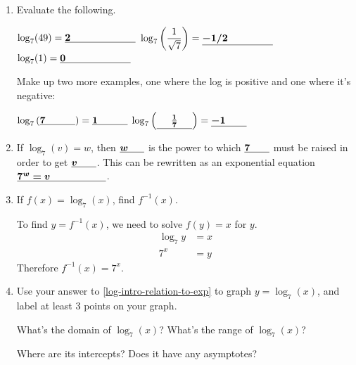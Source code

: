 \documentclass{article}
\begin{document}
\begin{enumerate}
\begin{enumerate}
  \item Evaluate the following.

    $\log_7 (49) = \fitb{1in}{2}$ \qquad $\displaystyle \log_7 \left( \frac{1}{\sqrt{7}} \right) = \fitb{1in}{-1/2}$ \qquad $\log_7 (1) = \fitb{1in}{0}$

    \pspace{0.5in}

    Make up two more examples, one where the log is positive and one where it's negative:

    $\log_7 \left( \fitb{0.5in}{7} \right)= \fitb{0.5in}{1}$ \qquad $\displaystyle \log_7 \left( \cfitb{0.5in}{\frac{1}{7}} \right) = \fitb{0.5in}{-1}$

    \pspace{0.5in}

    \pspace{\newpage}

  \item If $\log_7 (v) = w$, then $\fitb{0.35in}{w}$ is the power to which $\fitb{0.35in}{7}$ must be raised in order to get $\fitb{0.35in}{v}$. This can be rewritten as an exponential equation 
  $\fitb{1.25in}{7^w=v}$.

  \item \label{log-intro-relation-to-exp}
    \begin{problem}[\stretch{0.5}]
      If $f(x) = \log_7 (x)$, find $f^{-1}(x)$. 
    \end{problem}

    \begin{solution}
      To find $y=f^{-1}(x)$, we need to solve $f(y)=x$ for $y$.
      \begin{align*}
        \log_7 y &= x \\
        7^x &= y
      \end{align*}
      Therefore $f^{-1}(x) = 7^x$.
    \end{solution}

  \item
    \begin{problem}[\vfill]
      Use your answer to \ref{log-intro-relation-to-exp} to graph $y = \log_7 (x)$, and label at least 3 points on your graph.
    \end{problem}

    \begin{problem}
      What's the domain of $\log_7 (x)$? 
      \tab What's the range of $\log_7 (x)$?

      Where are its intercepts? \hspace{1in}
      \tab Does it have any asymptotes?
    \end{problem}


\end{enumerate}
\end{enumerate}
\end{document}
